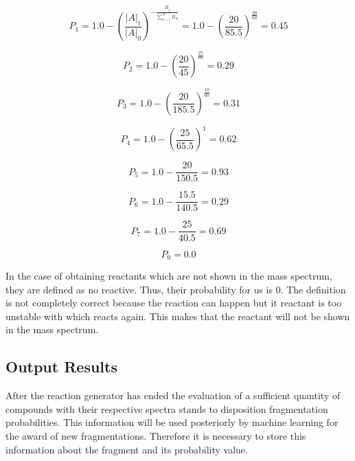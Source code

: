 \documentclass[10pt]{bmc_article}
\newenvironment{bmcformat}{\begin{raggedright}\baselineskip20pt\sloppy\setboolean{publ}{false}}{\end{raggedright}\baselineskip20pt\sloppy}
\begin{document}
\begin{bmcformat}
\begin{equation}
\label{p1}
P_1 = 1.0-\left( \frac{\left |A \right 
|_t}{\left|A\right|_0}\right)^{-\frac{\textstyle B_{j}}{\textstyle \sum_{k=1}^N 
B_{N}}} = 1.0-\left( \frac{20}{85.5}\right)^{\frac{\textstyle 20}{\textstyle 
60}} = 0.45
\end{equation}

\begin{equation}
\label{p2}
P_2 = 1.0-\left( \frac{20}{45}\right)^{\frac{\textstyle 25}{\textstyle 60}} = 
0.29
\end{equation}

\begin{equation}
\label{p3}
P_3 = 1.0-\left( \frac{20}{185.5}\right)^{\frac{\textstyle 10}{\textstyle 60}} 
= 0.31
\end{equation}


\begin{equation}
\label{p4}
P_4 = 1.0-\left( \frac{25}{65.5}\right)^{1} = 0.62
\end{equation}

\begin{equation}
\label{p5}
P_5 = 1.0- \frac{20}{150.5} = 0.93
\end{equation}


\begin{equation}
\label{p6}
P_6 = 1.0-\frac{15.5}{140.5} = 0.29
\end{equation}


\begin{equation}
\label{p7}
P_7 = 1.0-\frac{25}{40.5} = 0.69
\end{equation}


\begin{equation}
\label{p8}
P_0 = 0.0
\end{equation}

In the case of obtaining reactants which are not shown in the mass spectrum, 
they are defined as no reactive. Thus, their probability for us is 0. The 
definition is not completely correct because the reaction can happen but it 
reactant is too unstable with which reacts again. This makes that the reactant 
will not be shown in the mass spectrum.

\subsection{Output Results}

After the reaction generator has ended the evaluation of a sufficient quantity 
of compounds with their respective spectra stands to disposition fragmentation 
probabilities. This information will be used posteriorly by machine learning 
for the award of new fragmentations. Therefore it is necessary to store this 
information about the fragment and its probability value.



\end{bmcformat}
\end{document}

